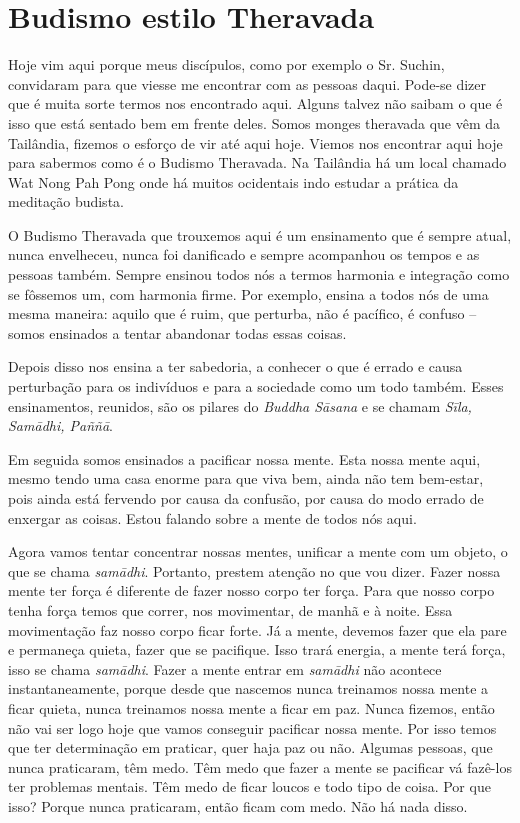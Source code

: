 
\chapter{Budismo estilo Theravada}
\markright{\theChapterAuthor}

Hoje vim aqui porque meus discípulos, como por exemplo o Sr. Suchin,
convidaram para que viesse me encontrar com as pessoas daqui. Pode-se
dizer que é muita sorte termos nos encontrado aqui. Alguns talvez não
saibam o que é isso que está sentado bem em frente deles. Somos monges
theravada que vêm da Tailândia, fizemos o esforço de vir até aqui hoje.
Viemos nos encontrar aqui hoje para sabermos como é o Budismo
Theravada. Na Tailândia há um local chamado Wat Nong Pah Pong onde há
muitos ocidentais indo estudar a prática da meditação budista. 

O Budismo Theravada que trouxemos aqui é um ensinamento que é sempre
atual, nunca envelheceu, nunca foi danificado e sempre acompanhou os
tempos e as pessoas também. Sempre ensinou todos nós a termos harmonia
e integração como se fôssemos um, com harmonia firme. Por exemplo,
ensina a todos nós de uma mesma maneira: aquilo que é ruim, que
perturba, não é pacífico, é confuso – somos ensinados a tentar
abandonar todas essas coisas. 

Depois disso nos ensina a ter sabedoria, a conhecer o que é errado e
causa perturbação para os indivíduos e para a sociedade como um todo
também. Esses ensinamentos, reunidos, são os pilares do \textit{Buddha
Sāsana} e se chamam \textit{Sīla, Samādhi, Paññā}.

Em seguida somos ensinados a pacificar nossa mente. Esta nossa mente
aqui, mesmo tendo uma casa enorme para que viva bem, ainda não tem
bem-estar, pois ainda está fervendo por causa da confusão, por causa do
modo errado de enxergar as coisas. Estou falando sobre a mente de todos
nós aqui.

Agora vamos tentar concentrar nossas mentes, unificar a mente com um
objeto, o que se chama \textit{samādhi}. Portanto, prestem atenção no
que vou dizer. Fazer nossa mente ter força é diferente de fazer nosso
corpo ter força. Para que nosso corpo tenha força temos que correr, nos
movimentar, de manhã e à noite. Essa movimentação faz nosso corpo ficar
forte. Já a mente, devemos fazer que ela pare e permaneça quieta, fazer
que se pacifique. Isso trará energia, a mente terá força, isso se chama
\textit{samādhi}. Fazer a mente entrar em \textit{samādhi} não
acontece instantaneamente, porque desde que nascemos nunca treinamos
nossa mente a ficar quieta, nunca treinamos nossa mente a ficar em paz.
Nunca fizemos, então não vai ser logo hoje que vamos conseguir
pacificar nossa mente. Por isso temos que ter determinação em praticar,
quer haja paz ou não. Algumas pessoas, que nunca praticaram, têm medo.
Têm medo que fazer a mente se pacificar vá fazê-los ter problemas
mentais. Têm medo de ficar loucos e todo tipo de coisa. Por que isso?
Porque nunca praticaram, então ficam com medo. Não há nada disso. 

